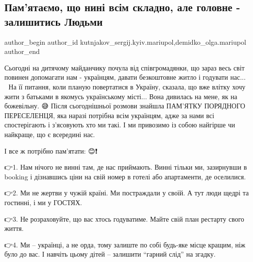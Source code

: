  
 
 
 
 

\subsection{Пам'ятаємо, що нині всім складно, але головне - залишитись Людьми}
\label{sec:13_05_2022.fb.kutnjakov_sergij.kyiv.mariupol.1.golovne_zalyshytys_ljudmy}
 
\ifcmt
 author_begin
   author_id kutnjakov_sergij.kyiv.mariupol,demidko_olga.mariupol
 author_end
\fi

Сьогодні на дитячому майданчику почула від співгромадянки, що зараз весь світ
повинен допомагати нам - українцям, давати  безкоштовне житло і годувати
нас...🤯😪  На її питання, коли планую повертатися в Україну, сказала, що вже
влітку хочу жити з батьками в якомусь українському місті... Вона дивилась на
мене, як на божевільну. 😅 Після сьогоднішньої розмови знайшла  ПАМ'ЯТКУ
ПОРЯДНОГО ПЕРЕСЕЛЕНЦЯ, яка наразі потрібна всім українцям, адже за нами всі
спостерігають і з'ясовують хто ми такі. І ми привозимо із собою найгірше чи
найкраще, що є всередині нас.

І все ж потрібно пам'ятати: 😊❗

👉1. Нам нічого не винні там, де нас приймають. Винні тільки ми, зазирнувши в
booking і дізнавшись ціни на свій номер в готелі або апартаменти, де оселилися.

👉2. Ми не жертви у чужій країні. Ми постраждали у своїй. А тут люди щедрі та
гостинні, і ми у ГОСТЯХ.

👉3. Не розраховуйте, що вас хтось  годуватиме. Майте свій план рестарту свого
життя.

👉4. Ми – українці, а не орда, тому залиште по собі будь-яке місце кращим, ніж
було до вас. І навчіть цьому дітей – залишити \enquote{гарний слід} на згадку.

